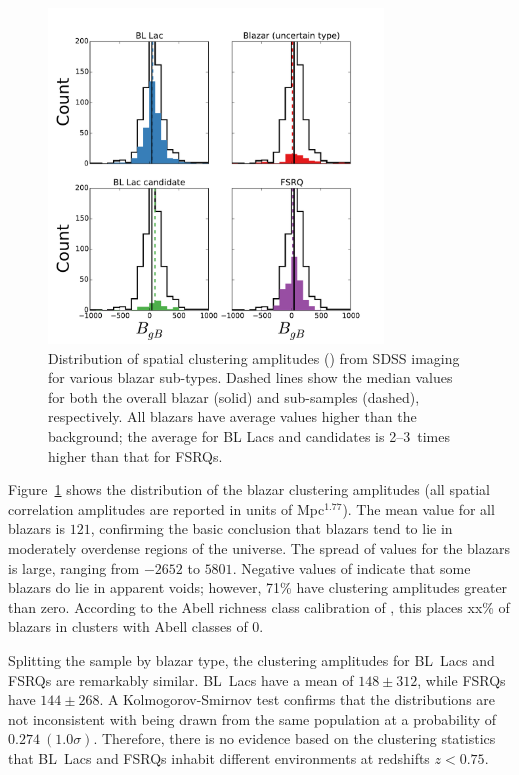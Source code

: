 \documentclass{emulateapj}
\begin{document}
\begin{figure}
\includegraphics[width=3.5in]{figures/bgb_hist.pdf}
\caption{Distribution of spatial clustering amplitudes (\bgb) from SDSS imaging for various blazar sub-types. Dashed lines show the median \bgb{} values for both the overall blazar (solid) and sub-samples (dashed), respectively. All blazars have average \bgb{} values higher than the background; the average \bgb{} for BL Lacs and candidates is 2--3~times higher than that for FSRQs.
\label{fig-bgb_hist}}
\end{figure}

Figure~\ref{fig-bgb_hist} shows the distribution of the blazar clustering amplitudes (all spatial correlation amplitudes are reported in units of Mpc$^{1.77}$). The mean value for all blazars is $121$, confirming the basic conclusion that blazars tend to lie in moderately overdense regions of the universe. The spread of \bgb{} values for the blazars is large, ranging from $-2652$ to $5801$. Negative values of \bgb{} indicate that some blazars do lie in apparent voids; however, 71\% have clustering amplitudes greater than zero. According to the Abell richness class calibration of \citet{yee99}, this places xx\% of blazars in clusters with Abell classes of 0.

Splitting the sample by blazar type, the clustering amplitudes for BL~Lacs and FSRQs are remarkably similar. BL~Lacs have a mean \bgb{} of $148\pm312$, while FSRQs have $144\pm268$. A Kolmogorov-Smirnov test confirms that the distributions are not inconsistent with being drawn from the same population at a probability of $0.274~(1.0\sigma)$. Therefore, there is no evidence based on the clustering statistics that BL~Lacs and FSRQs inhabit different environments at redshifts $z<0.75$. 
\end{document}
